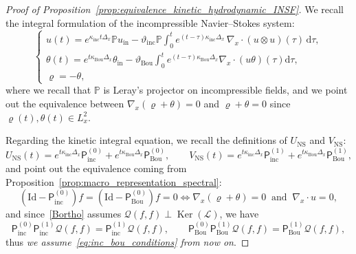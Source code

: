 \documentclass[10pt]{amsart}
\theoremstyle{definition}\newtheorem{defi}[theo]{Definition}\newtheorem{rema}[theo]{Remark}\newtheorem{exam}[theo]{Example}\newtheorem{exem}[theo]{Example}\newtheorem{nota}[theo]{Notation}
\DeclareMathOperator{\nul}{Ker}
\newcommand{\ini}{\mathrm{in}}
\newcommand{\ns}{\mathrm{NS}}
\newcommand{\Id}{\mathrm{Id}}
\renewcommand{\d}{\mathrm{d}}
\newcommand{\Inc}{\mathrm{inc}}
\newcommand{\Bou}{\mathrm{Bou}}
\newcommand{\bbP}{\mathbb{P}}
\newcommand{\LL}{\mathcal{L}}
\newcommand{\PP}{\mathsf{P}}
\newcommand{\QQ}{\mathcal{Q}}
\begin{document}
\begin{proof}[Proof of Proposition~\ref{prop:equivalence_kinetic_hydrodynamic_INSF}]
We recall the integral formulation of the incompressible Navier--Stokes system:
\[
\begin{cases}
\displaystyle u(t) = e^{ \kappa_\Inc t \Delta_x } \bbP u_\ini - \vartheta_\Inc \bbP \int_0^t e^{(t-\tau) \kappa_\Inc \Delta_x} \, \nabla_x \cdot \left(u \otimes u \right) (\tau) \, \d \tau, \\
\displaystyle \theta(t) = e^{ t \kappa_\Bou \Delta_x} \theta_\ini - \vartheta_\Bou \int_0^t e^{(t-\tau) \kappa_\Bou \Delta_x } \nabla_x \cdot (u \theta)(\tau) \d \tau, \\
\varrho = - \theta,
\end{cases}
\]
where we recall that $\bbP$ is Leray's projector on incompressible fields, and we point out the equivalence between $\nabla_x(\varrho +\theta) = 0$ and $\varrho + \theta = 0$ since $\varrho(t), \theta(t) \in L^2_x$.

Regarding the kinetic integral equation, we recall the definitions of $U_\ns$ and $V_\ns$:
\[
U_\ns(t) = e^{t \kappa_\Inc \Delta_x} \PP^{(0)}_{\Inc} + e^{t \kappa_\Bou \Delta_x} \PP^{(0)}_{\Bou}, \qquad V_\ns(t) = e^{t \kappa_\Inc \Delta_x} \PP^{(1)}_{\Inc} + e^{t \kappa_\Bou \Delta_x} \PP^{(1)}_{\Bou},
\]
and point out the equivalence coming from Proposition~\ref{prop:macro_representation_spectral}:
\begin{equation}\label{eq:inc_bou_conditions}
\left(\Id - \PP^{(0)}_\Inc \right) f = \left(\Id - \PP_\Bou^{(0)} \right) f = 0 \iff \nabla_x (\varrho + \theta) = 0~\text{ and }~\nabla_x \cdot u = 0,
\end{equation}
and since~\eqref{Bortho} assumes $\QQ(f, f) \perp \nul(\LL)$, we have
\[
\PP^{(0)}_\Inc \PP^{(1)}_\Inc \QQ(f, f) = \PP^{(1)}_\Inc \QQ(f, f), \qquad\PP^{(0)}_\Bou \PP^{(1)}_\Bou \QQ(f, f) = \PP^{(1)}_\Bou \QQ(f, f),
\]
thus \emph{we assume~\eqref{eq:inc_bou_conditions} from now on}.


\end{proof}
\end{document}
